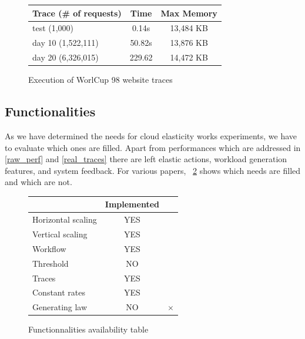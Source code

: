 \documentclass[a4paper, onecolumn, 11pt]{article}
\begin{document}
		\begin{figure}
			\centering
	    \begin{center}
	     	\begin{tabular}{| l | c | c |}
	     		\hline
	     		Trace (\# of requests) & Time & Max Memory\\ 
	     		\hline
	     		test (1,000) & 0.14s & 13,484 KB\\
		      \hline
		      day 10 (1,522,111) & 50.82s & 13,876 KB\\
		      \hline
		      day 20 (6,326,015) & 229.62 & 14,472 KB\\
	     		\hline
	     	\end{tabular}
	    \end{center}
	    \caption{Execution of WorlCup 98 website traces}
	    \label{tab_traces}
	  \end{figure}
  
  \subsection{Functionalities}
	  As we have determined the needs for cloud elasticity works experiments, we 
	  have to evaluate which ones are filled. Apart from performances which are 
	  addressed in \ref{raw_perf} and \ref{real_traces} there are left elastic 
	  actions, workload generation features, and system feedback. For various 
	  papers, \figurename~\ref{table_func} shows which needs are filled and which 
	  are not.
  
	  \begin{figure}
	  	\centering
	  	\begin{center}
	  		\begin{tabular}{| l | c | c |}
	  			\hline
	  			& Implemented & \cite{vasic2012dejavu}\\ 
	  			\hline
	  			Horizontal scaling & YES & \checkmark\\
	  			\hline
	  			Vertical scaling & YES & \checkmark\\
	  			\hline
	  			Workflow & YES & \\
	  			\hline
	  			Threshold & NO & \\
	  			\hline
	  			Traces & YES & \\
	  			\hline
	  			Constant rates & YES & \\
	  			\hline
	  			Generating law & NO & $\times$ \\
	  			\hline
	  		\end{tabular}
	  	\end{center}
	  	\caption{Functionnalities availability table}
	  	\label{table_func}
	  \end{figure}
  
\end{document}
